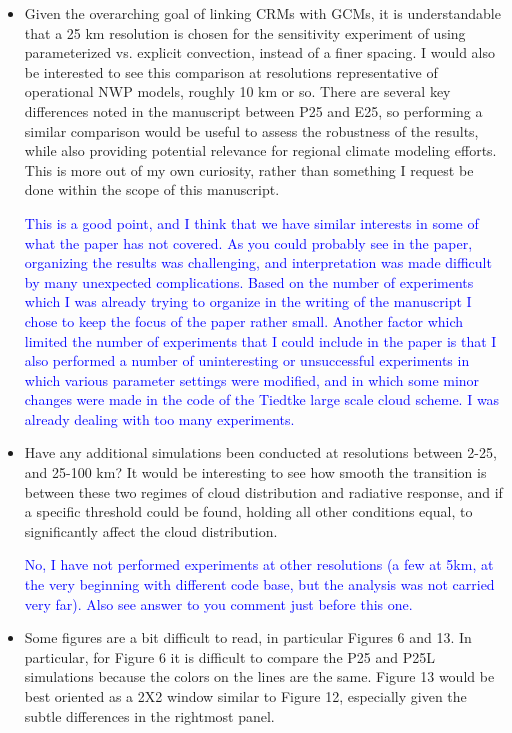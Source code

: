 \documentclass[draft]{agujournal2019}
\begin{document}
\begin{itemize}
  \item Given the overarching goal of linking CRMs with GCMs, it is understandable that a 25 km resolution is chosen for the sensitivity experiment of using parameterized vs. explicit convection, instead of a finer spacing. I would also be interested to see this comparison at resolutions representative of operational NWP models, roughly 10 km or so. There are several key differences noted in the manuscript between P25 and E25, so performing a similar comparison would be useful to assess the robustness of the results, while also providing potential relevance for regional climate modeling efforts. This is more out of my own curiosity, rather than something I request be done within the scope of this manuscript.  

  \textcolor{blue}{This is a good point, and I think that we have similar interests in some of what the paper has not covered.  As you could probably see in the paper, organizing the results was challenging, and interpretation was made difficult by many unexpected complications.  Based on the number of experiments which I was already trying to organize in the writing of the manuscript I chose to keep the focus of the paper rather small.   Another factor which limited the number of experiments that I could include in the paper is that I also performed a number of uninteresting or unsuccessful experiments in which various parameter settings were modified, and in which some minor changes were made in the code of the Tiedtke large scale cloud scheme.  I was already dealing with too many experiments. }

  \item Have any additional simulations been conducted at resolutions between 2-25, and 25-100 km? It would be interesting to see how smooth the transition is between these two regimes of cloud distribution and radiative response, and if a specific threshold could be found, holding all other conditions equal, to significantly affect the cloud distribution.  

  \textcolor{blue}{No, I have not performed experiments at other resolutions (a few at 5km, at the very beginning with different code base, but the analysis was not carried very far).  Also see answer to you comment just before this one. }

  \item Some figures are a bit difficult to read, in particular Figures 6 and 13. In particular, for Figure 6 it is difficult to compare the P25 and P25L simulations because the colors on the lines are the same. Figure 13 would be best oriented as a 2X2 window similar to Figure 12, especially given the subtle differences in the rightmost panel.


\end{itemize}
\end{document}
